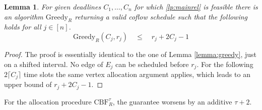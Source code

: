\documentclass[11pt]{article}
\newtheorem{lemma}[theorem]{Lemma}
\begin{document}
\begin{lemma}
For given deadlines $C_1,\dotsc,C_n$ for which \ref{lp:mainrel} is feasible there is an algorithm $\mathrm{Greedy}_R$ returning a valid coflow schedule such that the following holds for all  $j \in [n]$.
\begin{equation*}
\mathrm{Greedy}_R(C_j, r_j) \quad \le \quad r_j + 2C_j-1
\end{equation*}
\end{lemma}
\begin{proof}
The proof is essentially identical to the one of Lemma \ref{lemma:greedy}, just on a shifted interval. No edge of $E_j$ can be scheduled before $r_j$. For the following $2\lceil C_j \rceil$ time slots the same vertex allocation argument applies, which leads to an upper bound of $r_j + 2C_j - 1$.
\end{proof}


\noindent For the allocation procedure $\mathrm{CBF}^\tau_R$, the guarantee worsens by an additive $\tau+2$. 
\end{document}
